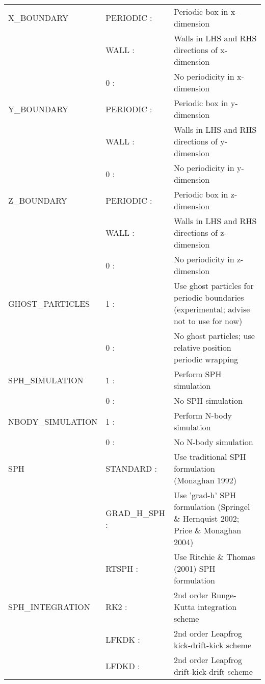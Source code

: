 \documentclass[a4paper]{article}
\begin{document}
\begin{center}
\begin{supertabular}{|p{4.6cm}|p{4.6cm} p{6.4cm}|}
 X\_BOUNDARY   & PERIODIC :& Periodic box in x-dimension  \\
               & WALL     :& Walls in LHS and RHS directions of x-dimension \\
               & 0        :& No periodicity in x-dimension \\ \hline

 Y\_BOUNDARY   & PERIODIC :& Periodic box in y-dimension \\
               & WALL     :& Walls in LHS and RHS directions of y-dimension \\
               & 0        :& No periodicity in y-dimension \\ \hline

 Z\_BOUNDARY   & PERIODIC :& Periodic box in z-dimension \\
               & WALL     :& Walls in LHS and RHS directions of z-dimension \\
               & 0        :& No periodicity in z-dimension \\ \hline

 GHOST\_PARTICLES       & 1 :& Use ghost particles for periodic boundaries (experimental; advise not to use for now) \\
                        & 0 :& No ghost particles; use relative position periodic wrapping \\ \hline

 SPH\_SIMULATION        & 1 :& Perform SPH simulation \\
                        & 0 :& No SPH simulation \\ \hline

 NBODY\_SIMULATION      & 1 :& Perform N-body simulation \\
                        & 0 :& No N-body simulation \\ \hline

 SPH           & STANDARD       :& Use traditional SPH formulation (Monaghan 1992) \\
               & GRAD\_H\_SPH   :& Use 'grad-h' SPH formulation (Springel \& Hernquist 2002; Price \& Monaghan 2004) \\ 
               & RTSPH          :& Use Ritchie \& Thomas (2001) SPH formulation \\ \hline

 SPH\_INTEGRATION & RK2   :& 2nd order Runge-Kutta integration scheme \\
                  & LFKDK :& 2nd order Leapfrog kick-drift-kick scheme \\
                  & LFDKD :& 2nd order Leapfrog drift-kick-drift scheme \\ \hline


\end{supertabular}
\end{center}
\end{document}

